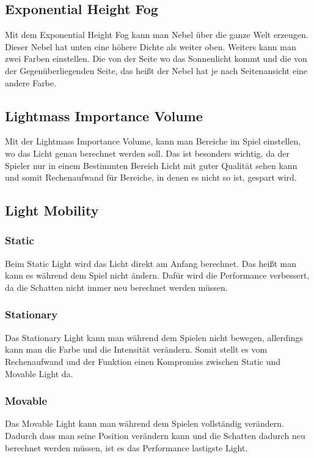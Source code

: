 \subsection{Exponential Height Fog}
Mit dem Exponential Height Fog kann man Nebel über die ganze Welt erzeugen. Dieser Nebel hat unten eine höhere Dichte als weiter oben. Weiters kann man zwei Farben einstellen.
Die von der Seite wo das Sonnenlicht kommt und die von der Gegenüberliegenden Seite, das heißt der Nebel hat je nach Seitenansicht eine andere Farbe. \citep{unreal:exponentialHeightFog}

\subsection{Lightmass Importance Volume}
Mit der Lightmass Importance Volume, kann man Bereiche im Spiel einstellen, wo das Licht genau berechnet werden soll. Das ist besonders wichtig, da der Spieler nur in einem
Bestimmten Bereich Licht mit guter Qualität sehen kann und somit Rechenaufwand für Bereiche, in denen es nicht so ist, gespart wird. \citep{unreal:lightmassImportanceVolume}

\subsection{Light Mobility}
\subsubsection{Static}
Beim Static Light wird das Licht direkt am Anfang berechnet. Das heißt man kann es während dem Spiel nicht ändern. Dafür wird die Performance verbessert, da
die Schatten nicht immer neu berechnet werden müssen. \citep{unreal:types_of_light}

\subsubsection{Stationary}
Das Stationary Light kann man während dem Spielen nicht bewegen, allerdings kann man die Farbe und die Intensität verändern. Somit stellt es vom Rechenaufwand und
der Funktion einen Kompromiss zwischen Static und Movable Light da. \citep{unreal:types_of_light}

\subsubsection{Movable}
Das Movable Light kann man während dem Spielen vollständig verändern. Dadurch dass man seine Position verändern kann und die Schatten dadurch neu berechnet werden müssen,
ist es das Performance lastigste Light.

